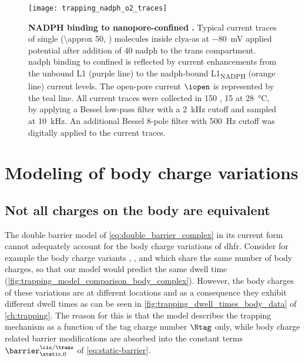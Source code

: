 %
\begin{figure*}[b]
  \centering
  \texttt{[image: trapping\_nadph\_o2\_traces]}
  \caption[{NADPH} binding to nanopore-confined .]{%
    \textbf{{NADPH} binding to nanopore-confined .}
    Typical current traces of single  (\SI{\approx 50}{\nM}, \cisi{}) molecules inside
    \gls{clya-as} at \SI{-80}{\mV} applied potential after addition of \SI{40}{\uM} \gls{nadph} to the trans
    compartment. \gls{nadph} binding to confined  is reflected by current enhancements from
    the unbound L1 (purple line) to the \gls{nadph}-bound L1\textsubscript{NADPH} (orange line) current
    levels. The open-pore current $\iopen$ is represented by the teal line. All current traces were collected
    in \SI{150}{\mM} , \SI{15}{\mM}   at \SI{28}{\celsius}, by applying a Bessel
    low-pass filter with a \SI{2}{\kilo\hertz} cutoff and sampled at \SI{10}{\kilo\hertz}. An additional
    Bessel 8-pole filter with \SI{500}{\hertz} cutoff was digitally applied to the current traces.
    }\label{fig:trapping_nadph_o2_traces}
\end{figure*}
%

%
\clearpage
%




\section{Modeling of body charge variations}
%
\label{sec:trapping_appendix:body_charge_variations}
%

\subsection{Not all charges on the body are equivalent}


The double barrier model of \cref{eq:double_barrier_complex} in its current form cannot adequately account for
the body charge variations of \gls{dhfr}\@. Consider for example the body charge variants ,
, and  which share the same number of body charges, so that our model would predict the
same dwell time (\cref{fig:trapping_model_comparison_body_complex}). However, the body charges of these
variations are at different locations and as a consequence they exhibit different dwell times as can be seen
in \cref{fig:trapping_dwell_times_body_data} of \cref{ch:trapping}. The reason for this is that the model
describes the trapping mechanism as a function of the tag charge number $\Ntag$ only, while body charge
related barrier modifications are absorbed into the constant terms $\barrier^{\cis/\trans}_{\static,0}$ of
\cref{eq:static-barrier}.

